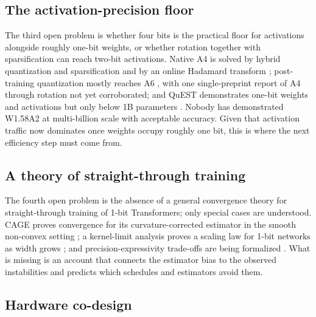 \documentclass[11pt]{article}
\begin{document}
\subsection{The activation-precision floor}

The third open problem is whether four bits is the practical floor for activations
alongside roughly one-bit weights, or whether rotation together with sparsification can
reach two-bit activations. Native A4 is solved by hybrid quantization and sparsification
\cite{Wang2024-BitNetA48} and by an online Hadamard transform \cite{Wang2025-BitNetV2};
post-training quantization mostly reaches A6 \cite{Zhao2026-BWLA,Ye2025-DBellQuant}, with
one single-preprint report of A4 through rotation \cite{Zhao2026-TWLA} not yet corroborated;
and QuEST
demonstrates one-bit weights and activations but only below 1B parameters
\cite{Panferov2025-QuEST}. Nobody has demonstrated W1.58A2 at multi-billion scale with
acceptable accuracy. Given that activation traffic now dominates once weights occupy
roughly one bit, this is where the next efficiency step must come from.

\subsection{A theory of straight-through training}

The fourth open problem is the absence of a general convergence theory for
straight-through training of 1-bit Transformers; only special cases are understood. CAGE
proves convergence for its curvature-corrected estimator in the smooth non-convex
setting \cite{Tabesh2025-CAGE}; a kernel-limit analysis proves a scaling law for 1-bit
networks as width grows \cite{Daliri2024-Theory1bit}; and precision-expressivity trade-offs
are being formalized \cite{Anon2026-EveryBitCounts,Anon2026-ExpressivePowerWQ}. What is
missing is an account that connects the estimator bias to the observed instabilities and
predicts which schedules and estimators avoid them.

\subsection{Hardware co-design}
\end{document}
